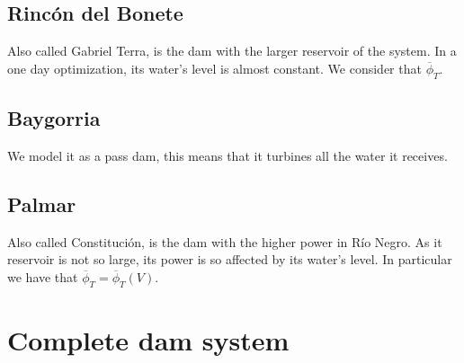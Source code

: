 \documentclass[12pt]{article}
\theoremstyle{definition}
\theoremstyle{remark}
\begin{document}
\subsection{Rinc\'on del Bonete}

Also called Gabriel Terra, is the dam with the larger reservoir of the system. In a one day optimization, its water's level is almost constant. We consider that $\overline{\phi}_T$.

\subsection{Baygorria}

We model it as a pass dam, this means that it turbines all the water it receives.

\subsection{Palmar}

Also called Constituci\'on, is the dam with the higher power in R\'io Negro. As it reservoir is not so large, its power is so affected by its water's level. In particular we have that $\overline{\phi}_T=\overline{\phi}_T(V)$.

\section{Complete dam system}
\end{document}
